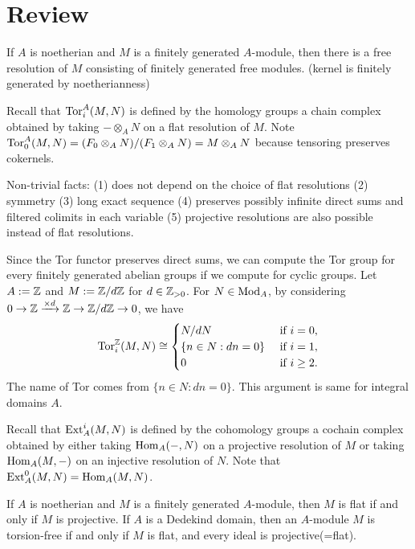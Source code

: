 \documentclass{../../../small}
\begin{document}
\section*{Review}

\begin{rmk*}
If $A$ is noetherian and $M$ is a finitely generated $A$-module, then there is a free resolution of $M$ consisting of finitely generated free modules. (kernel is finitely generated by noetherianness)
\end{rmk*}

Recall that $\operatorname{Tor}^A_i(M,N)$ is defined by the homology groups a chain complex obtained by taking $-\otimes_AN$ on a flat resolution of $M$.
Note $\operatorname{Tor}^A_0(M,N)=(F_0\otimes_AN)/(F_1\otimes_AN)=M\otimes_AN$ because tensoring preserves cokernels.

Non-trivial facts: (1) does not depend on the choice of flat resolutions (2) symmetry (3) long exact sequence (4) preserves possibly infinite direct sums and filtered colimits in each variable (5) projective resolutions are also possible instead of flat resolutions.

\begin{ex*}
Since the Tor functor preserves direct sums, we can compute the Tor group for every finitely generated abelian groups if we compute for cyclic groups.
Let $A:=\mathbb{Z}$ and $M:=\mathbb{Z}/d\mathbb{Z}$ for $d\in\mathbb{Z}_{>0}$.
For $N\in\operatorname{Mod}_A$, by considering $0\to\mathbb{Z}\xrightarrow{\times d}\mathbb{Z}\to\mathbb{Z}/d\mathbb{Z}\to0$, we have
\[\operatorname{Tor}_i^{\mathbb{Z}}(M,N)\cong\begin{cases}N/dN&\text{ if }i=0,\\\{n\in N:dn=0\}&\text{ if }i=1,\\0&\text{ if }i\ge2.\end{cases}\]
The name of Tor comes from $\{n\in N:dn=0\}$.
This argument is same for integral domains $A$.
\end{ex*}

Recall that $\operatorname{Ext}_A^i(M,N)$ is defined by the cohomology groups a cochain complex obtained by either taking $\operatorname{Hom}_A(-,N)$ on a projective resolution of $M$ or taking $\operatorname{Hom}_A(M,-)$ on an injective resolution of $N$.
Note that $\operatorname{Ext}_A^0(M,N)=\operatorname{Hom}_A(M,N)$.

\begin{ex*}
If $A$ is noetherian and $M$ is a finitely generated $A$-module, then $M$ is flat if and only if $M$ is projective.
If $A$ is a Dedekind domain, then an $A$-module $M$ is torsion-free if and only if $M$ is flat, and every ideal is projective(=flat).
\end{ex*}
\end{document}
